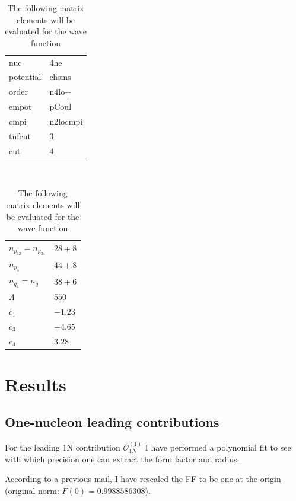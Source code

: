 \documentclass[onecolumn]{revtex4-2}
\begin{document}
\begin{table}[htb!]
    \caption{The following matrix elements will be evaluated for the wave function}
    \label{}
    \begin{tabular}{ll}
    nuc       &       4he \\
    potential &     chsms \\
    order     &     n4lo+ \\
    empot     &     pCoul \\
    cmpi      &  n2locmpi \\
    tnfcut    &         $3$ \\
    cut       &        $4$\\
    \end{tabular}$\quad$
    \begin{tabular}{ll}
    $n_{p_{12}} = n_{p_{34}}$ &      $28+8$ \\
    $n_{p_{3}}$       &      $44+8$ \\
    $n_{q_4} = n_q$   &      $38+6$ \\
    $\Lambda$       &       $550$\\
    $c_1$        &  $-1.23$ \\
    $c_3$        &  $-4.65$ \\
    $c_4$        &  $3.28$
    \end{tabular}
\end{table}

\section{Results}

\subsection{One-nucleon leading contributions}

For the leading 1N contribution $\mathcal{O}_{1N}^{(1)}$ I have performed a polynomial fit to see with which precision one can extract the form factor and radius.

According to a previous mail, I have rescaled the FF to be one at the origin (original norm: $F(0) = 0.9988586308$).
\end{document}
